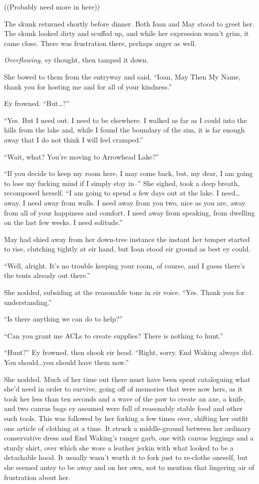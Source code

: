 ((Probably need more in here))

The skunk returned shortly before dinner. Both Ioan and May stood to greet her. The skunk looked dirty and scuffed up, and while her expression wasn't grim, it came close. There was frustration there, perhaps anger as well.

\emph{Overflowing,} ey thought, then tamped it down.

She bowed to them from the entryway and said, ``Ioan, May Then My Name, thank you for hosting me and for all of your kindness.''

Ey frowned. ``But\ldots?''

``Yes. But I need out. I need to be elsewhere. I walked as far as I could into the hills from the lake and, while I found the boundary of the sim, it is far enough away that I do not think I will feel cramped.''

``Wait, what? You're moving to Arrowhead Lake?''

``If you decide to keep my room here, I may come back, but, my dear, I am going to lose my fucking mind if I simply stay in--'' She sighed, took a deep breath, recomposed herself. ``I am going to spend a few days out at the lake. I need\ldots away. I need away from walls. I need away from you two, nice as you are, away from all of your happiness and comfort. I need away from speaking, from dwelling on the last few weeks. I need solitude.''

May had shied away from her down-tree instance the instant her temper started to rise, clutching tightly at eir hand, but Ioan stood eir ground as best ey could.

``Well, alright. It's no trouble keeping your room, of course, and I guess there's the tents already out there.''

She nodded, subsiding at the reasonable tone in eir voice. ``Yes. Thank you for understanding.''

``Is there anything we can do to help?''

``Can you grant me ACLs to create supplies? There is nothing to hunt.''

``Hunt?'' Ey frowned, then shook eir head. ``Right, sorry. End Waking always did. You should\ldots you should have them now.''

She nodded. Much of her time out there must have been spent cataloguing what she'd need in order to survive, going off of memories that were now hers, as it took her less than ten seconds and a wave of the paw to create an axe, a knife, and two canvas bags ey assumed were full of reasonably stable food and other such tools. This was followed by her forking a few times over, shifting her outfit one article of clothing at a time. It struck a middle-ground between her ordinary conservative dress and End Waking's ranger garb, one with canvas leggings and a sturdy shirt, over which she wore a leather jerkin with what looked to be a detachable hood. It usually wasn't worth it to fork just to re-clothe oneself, but she seemed antsy to be away and on her own, not to mention that lingering air of frustration about her.

